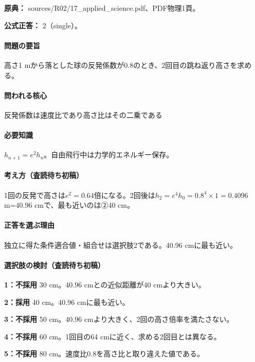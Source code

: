 \noindent\textbf{原典：} sources/R02/17\_applied\_science.pdf、PDF物理1頁。

\textbf{公式正答：} 2（single）。

\paragraph{問題の要旨} 高さ1 mから落とした球の反発係数が0.8のとき、2回目の跳ね返り高さを求める。

\paragraph{問われる核心} 反発係数は速度比であり高さ比はその二乗である

\paragraph{必要知識} \(h_{n+1}=e^2h_n\)。自由飛行中は力学的エネルギー保存。

\paragraph{考え方（査読待ち初稿）} 1回の反発で高さは\(e^2=0.64\)倍になる。2回後は\(h_2=e^4h_0=0.8^4\times1=0.4096\) m=40.96 cmで、最も近いのは②40 cm。

\paragraph{正答を選ぶ理由} 独立に得た条件適合値・組合せは選択肢2である。40.96 cmに最も近い。

\paragraph{選択肢の検討（査読待ち初稿）}

\noindent\textbf{1：不採用} 30 cm。40.96 cmとの近似距離が40 cmより大きい。\par

\noindent\textbf{2：採用} 40 cm。40.96 cmに最も近い。\par

\noindent\textbf{3：不採用} 50 cm。40.96 cmより大きく、2回の高さ倍率を満たさない。\par

\noindent\textbf{4：不採用} 60 cm。1回目の64 cmに近く、求める2回目とは異なる。\par

\noindent\textbf{5：不採用} 80 cm。速度比0.8を高さ比と取り違えた値である。\par

